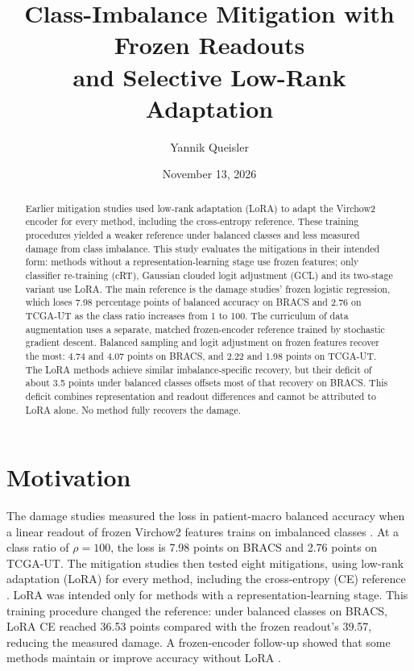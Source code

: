 \documentclass[11pt]{article}
\title{Class-Imbalance Mitigation with Frozen Readouts\\and Selective Low-Rank Adaptation}
\author{Yannik Queisler}
\date{November 13, 2026}
\begin{document}
\raggedbottom
{}
\setlength{\emergencystretch}{2em}
\maketitle
\begin{abstract}
\noindent Earlier mitigation studies used low-rank adaptation (LoRA) to adapt the Virchow2 encoder for every method, including the cross-entropy reference. These training procedures yielded a weaker reference under balanced classes and less measured damage from class imbalance. This study evaluates the mitigations in their intended form: methods without a representation-learning stage use frozen features; only classifier re-training (cRT), Gaussian clouded logit adjustment (GCL) and its two-stage variant use LoRA. The main reference is the damage studies' frozen logistic regression, which loses 7.98 percentage points of balanced accuracy on BRACS and 2.76 on TCGA-UT as the class ratio increases from 1 to 100. The curriculum of data augmentation uses a separate, matched frozen-encoder reference trained by stochastic gradient descent. Balanced sampling and logit adjustment on frozen features recover the most: 4.74 and 4.07 points on BRACS, and 2.22 and 1.98 points on TCGA-UT. The LoRA methods achieve similar imbalance-specific recovery, but their deficit of about 3.5 points under balanced classes offsets most of that recovery on BRACS. This deficit combines representation and readout differences and cannot be attributed to LoRA alone. No method fully recovers the damage.
\end{abstract}

\section{Motivation}
\label{sec:motivation}
The damage studies measured the loss in patient-macro balanced accuracy when a linear readout of frozen Virchow2 features \citep{zimmermann2024virchow2} trains on imbalanced classes \citep{queisler2026prevalenceTcga,queisler2026prevalenceBracs}. At a class ratio of $\rho=100$, the loss is 7.98 points on BRACS and 2.76 points on TCGA-UT. The mitigation studies then tested eight mitigations, using low-rank adaptation (LoRA) \citep{hu2022lora} for every method, including the cross-entropy (CE) reference \citep{queisler2026mitigationBracs,queisler2026mitigationTcga}. LoRA was intended only for methods with a representation-learning stage. This training procedure changed the reference: under balanced classes on BRACS, LoRA CE reached 36.53 points compared with the frozen readout's 39.57, reducing the measured damage. A frozen-encoder follow-up showed that some methods maintain or improve accuracy without LoRA \citep{queisler2026loraAblation}.
\end{document}
